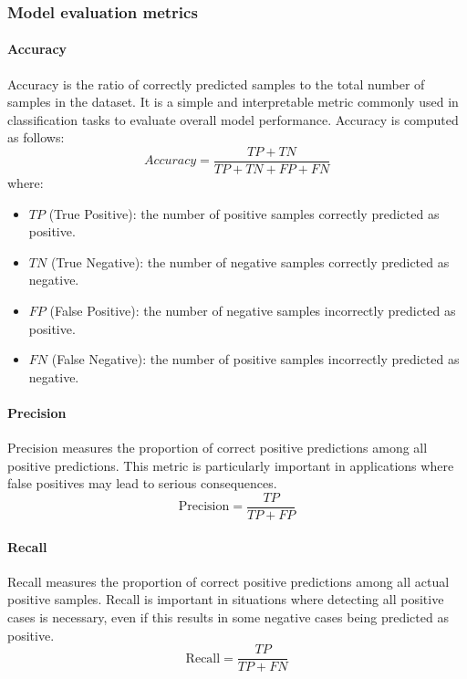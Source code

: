 \documentclass[10pt,twoside]{article}
\begin{document}
\subsubsection{Model evaluation metrics}
\paragraph{Accuracy}
Accuracy \cite{grandini_metrics_2020} is the ratio of correctly predicted samples to the total number of samples in the dataset. It is a simple and interpretable metric commonly used in classification tasks to evaluate overall model performance. Accuracy is computed as follows:
\begin{equation} Accuracy = \frac{TP + TN}{TP + TN + FP + FN}
\end{equation} where:
\begin{itemize}
\item $TP$ (True Positive): the number of positive samples correctly predicted as positive.
\item $TN$ (True Negative): the number of negative samples correctly predicted as negative.
\item $FP$ (False Positive): the number of negative samples incorrectly predicted as positive.
\item $FN$ (False Negative): the number of positive samples incorrectly predicted as negative.
\end{itemize}
\paragraph{Precision}
Precision \cite{grandini_metrics_2020} measures the proportion of correct positive predictions among all positive predictions. This metric is particularly important in applications where false positives may lead to serious consequences.
\begin{equation}
\mathrm{Precision}=\frac{TP}{TP+FP}
\end{equation}
\paragraph{Recall}
Recall \cite{grandini_metrics_2020} measures the proportion of correct positive predictions among all actual positive samples. Recall is important in situations where detecting all positive cases is necessary, even if this results in some negative cases being predicted as positive.
\begin{equation}
\mathrm{Recall}=\frac{TP}{TP+FN}
\end{equation}
\end{document}
